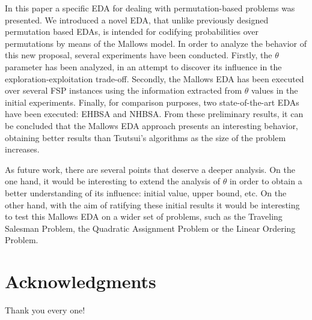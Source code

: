 \documentclass[runningheads]{llncs}
\begin{document}
In this paper a specific EDA for dealing with permutation-based problems was presented.  We introduced a novel EDA, that unlike previously designed permutation based EDAs, is intended for codifying probabilities over permutations by means of the Mallows model. In order to analyze the behavior of this new proposal, several experiments have been conducted. Firstly, the $\theta$ parameter has been analyzed, in an attempt to discover its influence in the exploration-exploitation trade-off. Secondly, the Mallows EDA has been executed over several FSP instances using the information extracted from $\theta$ values in the initial experiments. Finally, for comparison purposes, two state-of-the-art EDAs have been executed: EHBSA and NHBSA. From these preliminary results, it can be concluded that the Mallows EDA approach presents an interesting behavior, obtaining better results than Tsutsui's algorithms as the size of the problem increases.

As future work, there are several points that deserve a deeper analysis. On the one hand, it would be interesting to extend the analysis of $\theta$ in order to obtain a better understanding of its influence: initial value, upper bound, etc. On the other hand, with the aim of ratifying these initial results it would be interesting to test this Mallows EDA on a wider set of problems, such as the Traveling Salesman Problem, the Quadratic Assignment Problem or the Linear Ordering Problem.

\section*{Acknowledgments} 
Thank you every one!


\end{document}
